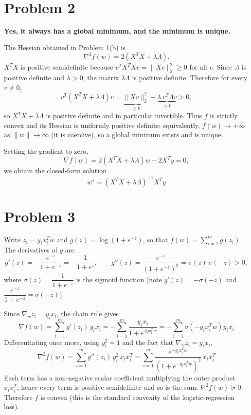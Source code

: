 \documentclass[UTF8,a4paper,12pt]{ctexart}
\begin{document}
\section*{Problem 2}

\textbf{Yes, it always has a global minimum, and the minimum is unique.}

The Hessian obtained in Problem 1(b) is
\[
\nabla^2 f(w)=2\left(X^TX+\lambda\Lambda\right).
\]
$X^TX$ is positive semidefinite because $v^TX^TXv=\lVert Xv\rVert_2^2\ge0$ for
all $v$. Since $\Lambda$ is positive definite and $\lambda>0$, the matrix
$\lambda\Lambda$ is positive definite. Therefore for every $v\neq0$,
\[
v^T\left(X^TX+\lambda\Lambda\right)v
=\underbrace{\lVert Xv\rVert_2^2}_{\ge0}
+\underbrace{\lambda\,v^T\Lambda v}_{>0}
>0,
\]
so $X^TX+\lambda\Lambda$ is positive definite and in particular invertible.
Thus $f$ is strictly convex and its Hessian is uniformly positive definite;
equivalently, $f(w)\to+\infty$ as $\lVert w\rVert\to\infty$ (it is coercive), so
a global minimum exists and is unique.

Setting the gradient to zero,
\[
\nabla f(w)=2\left(X^TX+\lambda\Lambda\right)w-2X^Ty=0,
\]
we obtain the closed-form solution
\[
\boxed{
w^\star=\left(X^TX+\lambda\Lambda\right)^{-1}X^Ty
}
\]

\section*{Problem 3}

Write $z_i=y_ix_i^Tw$ and $g(z)=\log(1+e^{-z})$, so that
$f(w)=\sum_{i=1}^m g(z_i)$. The derivatives of $g$ are
\[
g'(z)=-\frac{e^{-z}}{1+e^{-z}}=-\frac{1}{1+e^{z}},
\qquad
g''(z)=\frac{e^{-z}}{\left(1+e^{-z}\right)^2}
=\sigma(z)\,\sigma(-z)>0,
\]
where $\sigma(z)=\dfrac{1}{1+e^{-z}}$ is the sigmoid function (note
$g'(z)=-\sigma(-z)$ and $\dfrac{e^{-z}}{1+e^{-z}}=\sigma(-z)$).

Since $\nabla_w z_i=y_ix_i$, the chain rule gives
\[
\boxed{
\nabla f(w)=\sum_{i=1}^m g'(z_i)\,y_ix_i
=-\sum_{i=1}^m \frac{y_ix_i}{1+e^{\,y_ix_i^Tw}}
=-\sum_{i=1}^m \sigma\!\left(-y_ix_i^Tw\right)y_ix_i
}
\]
Differentiating once more, using $y_i^2=1$ and the fact that
$\nabla_w z_i=y_ix_i$,
\[
\boxed{
\nabla^2 f(w)=\sum_{i=1}^m g''(z_i)\,y_i^2\,x_ix_i^T
=\sum_{i=1}^m \frac{e^{-y_ix_i^Tw}}
{\left(1+e^{-y_ix_i^Tw}\right)^2}\,x_ix_i^T
}
\]
Each term has a non-negative scalar coefficient multiplying the outer product
$x_ix_i^T$, hence every term is positive semidefinite and so is the sum:
$\nabla^2 f(w)\succeq0$. Therefore $f$ is convex (this is the standard
convexity of the logistic-regression loss).
\end{document}

